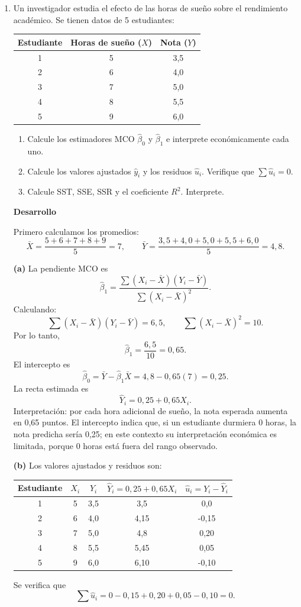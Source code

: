 \documentclass[letterpaper,11pt]{article}
\begin{document}
\begin{enumerate}
\item Un investigador estudia el efecto de las horas de sueño sobre el rendimiento académico. Se tienen datos de 5 estudiantes:
\begin{center}
    \begin{tabular}{| c | c | c |}
\hline
\textbf{Estudiante} & \textbf{Horas de sueño ($X$)} & \textbf{Nota ($Y$)} \\ \hline
1 & 5 & 3,5 \\
2 & 6 & 4,0 \\
3 & 7 & 5,0 \\
4 & 8 & 5,5 \\
5 & 9 & 6,0 \\ \hline
\end{tabular}
\end{center}
\begin{enumerate}[label=(\alph*)]
    \item Calcule los estimadores MCO $\hat{\beta}_0$ y $\hat{\beta}_1$ e interprete económicamente cada uno.
    \item Calcule los valores ajustados $\hat{y}_i$ y los residuos $\hat{u}_i$. Verifique que $\sum \hat{u}_i = 0$.
    \item Calcule SST, SSE, SSR y el coeficiente $R^2$. Interprete.
\end{enumerate}

\textbf{Desarrollo}

Primero calculamos los promedios:
\[
\bar{X}=\frac{5+6+7+8+9}{5}=7,
\qquad
\bar{Y}=\frac{3,5+4,0+5,0+5,5+6,0}{5}=4,8.
\]

\textbf{(a)} La pendiente MCO es
\[
\hat{\beta}_1=
\frac{\sum (X_i-\bar{X})(Y_i-\bar{Y})}{\sum (X_i-\bar{X})^2}.
\]
Calculando:
\[
\sum (X_i-\bar{X})(Y_i-\bar{Y})=6,5,
\qquad
\sum (X_i-\bar{X})^2=10.
\]
Por lo tanto,
\[
\hat{\beta}_1=\frac{6,5}{10}=0,65.
\]
El intercepto es
\[
\hat{\beta}_0=\bar{Y}-\hat{\beta}_1\bar{X}=4,8-0,65(7)=0,25.
\]
La recta estimada es
\[
\boxed{\hat{Y}_i=0,25+0,65X_i.}
\]
Interpretación: por cada hora adicional de sueño, la nota esperada aumenta en 0,65 puntos. El intercepto indica que, si un estudiante durmiera 0 horas, la nota predicha sería 0,25; en este contexto su interpretación económica es limitada, porque 0 horas está fuera del rango observado.

\textbf{(b)} Los valores ajustados y residuos son:
\begin{center}
\begin{tabular}{|c|c|c|c|c|}
\hline
Estudiante & $X_i$ & $Y_i$ & $\hat{Y}_i=0,25+0,65X_i$ & $\hat{u}_i=Y_i-\hat{Y}_i$ \\ \hline
1 & 5 & 3,5 & 3,5 & 0,0 \\
2 & 6 & 4,0 & 4,15 & -0,15 \\
3 & 7 & 5,0 & 4,8 & 0,20 \\
4 & 8 & 5,5 & 5,45 & 0,05 \\
5 & 9 & 6,0 & 6,10 & -0,10 \\ \hline
\end{tabular}
\end{center}
Se verifica que
\[
\sum \hat{u}_i=0-0,15+0,20+0,05-0,10=0.
\]


\end{enumerate}
\end{document}

